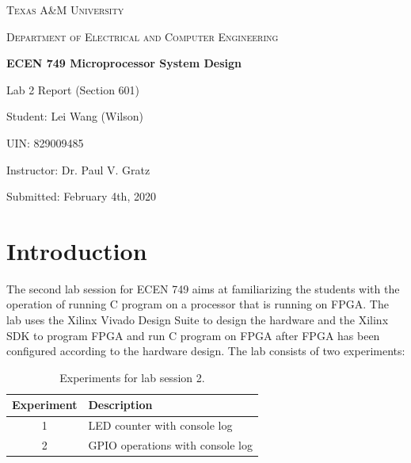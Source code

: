 \documentclass[11pt,letterpaper,titlepage]{article}
\begin{document}
\begin{titlepage}
  \centering
	{\scshape\large Texas A\&M University \par}
	\vspace{1cm}
	{\scshape\Large Department of Electrical and Computer Engineering \par}
	\vspace{4cm}
    \vspace{0.5cm}
	{\huge\bfseries ECEN 749 Microprocessor System Design\par}
	\vspace{4cm}
	{\Large Lab 2 Report (Section 601)\par}
	\vspace{1cm}
	{\Large Student: Lei Wang (Wilson)\par}
	\vspace{1cm}
	{\Large UIN: 829009485\par}
	\vspace{1cm}
	{\Large Instructor: Dr. Paul V. Gratz\par}
	\vspace{4cm}
	\vfill

	{\large Submitted: February 4th, 2020 \par}

\end{titlepage}

\newpage

\tableofcontents{}

\newpage

\part{Introduction}

The second lab session for ECEN 749 aims at familiarizing the students with the operation of running C program on a processor that is running on FPGA. The lab uses the Xilinx Vivado Design Suite to design the hardware and the Xilinx SDK to program FPGA and run C program on FPGA after FPGA has been configured according to the hardware design. The lab consists of two experiments:

\begin{table}[ht]
\centering
\begin{tabular}{@{}cl@{}}
\toprule
Experiment & Description                      \\ \midrule
1          & LED counter with console log     \\ \midrule
2          & GPIO operations with console log \\ \bottomrule
\end{tabular}
\caption{Experiments for lab session 2.}
\end{table}
\end{document}
